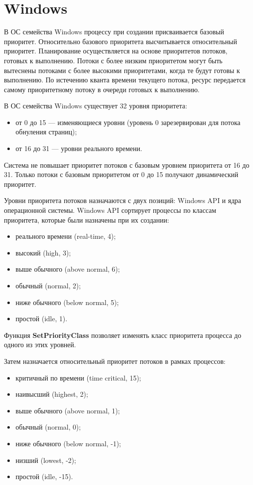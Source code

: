 \section{Windows}

В ОС семейства Windows процессу при создании присваивается базовый приоритет.
Относительно базового приоритета высчитывается относительный приоритет. Планирование
осуществляется на основе приоритетов потоков, готовых к выполнению. Потоки с более низким
приоритетом могут быть вытеснены потоками с более высокими приоритетами, когда те будут
готовы к выполнению. По истечению кванта времени текущего потока, ресурс передается
самому приоритетному потоку в очереди готовых к выполнению.

В ОС семейства Windows существует 32 уровня приоритета:
\begin{itemize}
    \item от 0 до 15 — изменяющиеся уровни (уровень 0 зарезервирован для потока обнуления
страниц);
\item от 16 до 31 — уровни реального времени.
\end{itemize}

Система не повышает приоритет потоков с базовым уровнем приоритета от 16 до 31.
Только потоки с базовым приоритетом от 0 до 15 получают динамический приоритет.

Уровни приоритета потоков назначаются с двух позиций: Windows API и ядра
операционной системы. Windows API сортирует процессы по классам приоритета, которые
были назначены при их создании:
\begin{itemize}
    \item реального времени (real-time, 4);
    \item высокий (high, 3);
    \item выше обычного (above normal, 6);
    \item обычный (normal, 2);
    \item ниже обычного (below normal, 5);
    \item простой (idle, 1).
    
\end{itemize}

Функция \textbf{SetPriorityClass} позволяет изменять класс приоритета процесса до одного из
этих уровней.

Затем назначается относительный приоритет потоков в рамках процессов:
\begin{itemize}
    \item критичный по времени (time critical, 15);
    \item наивысший (highest, 2);
    \item выше обычного (above normal, 1);
    \item обычный (normal, 0);
    \item ниже обычного (below normal, -1);
    \item низший (lowest, -2);
    \item  простой (idle, -15).
\end{itemize}

